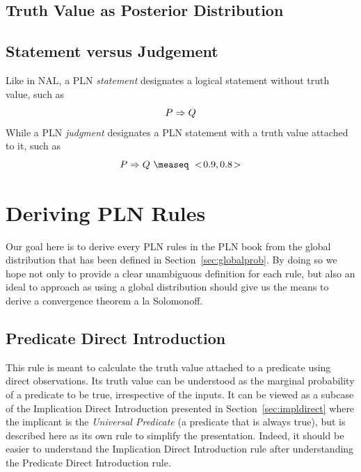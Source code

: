 \documentclass[]{article}
\begin{document}
\subsection{Truth Value as Posterior Distribution}
\label{sec:truthvalue}

\subsection{Statement versus Judgement}
\label{sec:statjudge}
Like in NAL, a PLN \emph{statement} designates a logical statement
without truth value, such as
$$P \Rightarrow Q$$ While a PLN \emph{judgment} designates a PLN statement
with a truth value attached to it, such as
$$P \limp Q\ \measeq\ \STV{0.9}{0.8}$$

\section{Deriving PLN Rules}
\label{sec:derules}
Our goal here is to derive every PLN rules in the PLN book from the
global distribution that has been defined in
Section~\ref{sec:globalprob}.  By doing so we hope not only to
provide a clear unambiguous definition for each rule, but also an
ideal to approach as using a global distribution should give us the
means to derive a convergence theorem a la Solomonoff.

\subsection{Predicate Direct Introduction}
This rule is meant to calculate the truth value attached to a
predicate using direct observations.  Its truth value can be
understood as the marginal probability of a predicate to be true,
irrespective of the inputs.  It can be viewed as a subcase of the
Implication Direct Introduction presented in
Section~\ref{sec:impldirect} where the implicant is the
\emph{Universal Predicate} (a predicate that is always true), but is
described here as its own rule to simplify the presentation.  Indeed,
it should be easier to understand the Implication Direct Introduction
rule after understanding the Predicate Direct Introduction rule.
\end{document}
